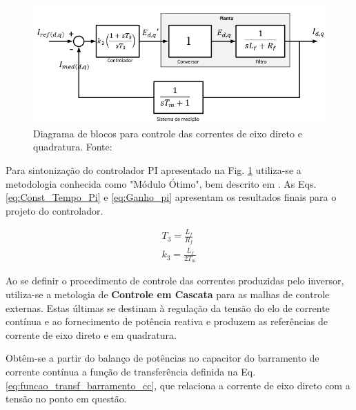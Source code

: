 \begin{figure}[!hbt]
	\begin{center}
		\includegraphics[width=\columnwidth]{figuras/Diagram_Blocos_Eixo_Direto_Quadratura.PNG}
		\caption{Diagrama de blocos para controle das correntes de eixo direto e quadratura. Fonte: \cite{TeseProfAlex}}
		\label{fig:Diagrama_blocos_eixo_dir_quadr}
	\end{center}
\end{figure}

Para sintonização do controlador PI apresentado na Fig. \ref{fig:Diagrama_blocos_eixo_dir_quadr} utiliza-se a metodologia conhecida como "Módulo Ótimo", bem descrito em \cite{ArticleRezek}. As Eqs. \ref{eq:Const_Tempo_Pi} e \ref{eq:Ganho_pi} apresentam os resultados finais para o projeto do controlador.

\begin{align}
	T_3 = \frac{L_f}{R_f}\label{eq:Const_Tempo_Pi}\\
	k_3 = \frac{L_f}{2T_m}\label{eq:Ganho_pi}
\end{align}

Ao se definir o procedimento de controle das correntes produzidas pelo inversor, utiliza-se a metologia de \textbf{Controle em Cascata} para as malhas de controle externas. Estas últimas se destinam à regulação da tensão do elo de corrente contínua e ao fornecimento de potência reativa e produzem as referências de corrente de eixo direto e em quadratura.

Obtêm-se a partir do balanço de potências no capacitor do barramento de corrente contínua a função de transferência definida na Eq. \ref{eq:funcao_transf_barramento_cc}, que relaciona a corrente de eixo direto com a tensão no ponto em questão.

